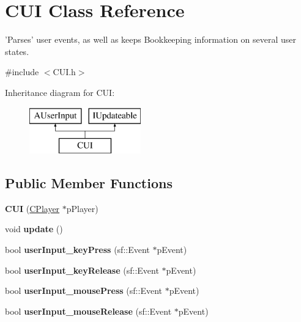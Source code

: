 \hypertarget{classCUI}{\section{C\-U\-I Class Reference}
\label{classCUI}
}


'Parses' user events, as well as keeps Bookkeeping information on several user states.  




{\ttfamily \#include $<$C\-U\-I.\-h$>$}

Inheritance diagram for C\-U\-I\-:\begin{figure}[H]
\begin{center}
\leavevmode
\includegraphics[height=2.000000cm]{classCUI}
\end{center}
\end{figure}
\subsection*{Public Member Functions}
\begin{DoxyCompactItemize}
\item 
\hypertarget{classCUI_aaca9bcb98d25fa4b4868bc3266f44ec6}{{\bfseries C\-U\-I} (\hyperlink{classCPlayer}{C\-Player} $\ast$p\-Player)}\label{classCUI_aaca9bcb98d25fa4b4868bc3266f44ec6}

\item 
\hypertarget{classCUI_ab0b322040b41a6650bd625216f77b75c}{void {\bfseries update} ()}\label{classCUI_ab0b322040b41a6650bd625216f77b75c}

\item 
\hypertarget{classCUI_addb1531f20541cb7c7f8688f1cd843e9}{bool {\bfseries user\-Input\-\_\-key\-Press} (sf\-::\-Event $\ast$p\-Event)}\label{classCUI_addb1531f20541cb7c7f8688f1cd843e9}

\item 
\hypertarget{classCUI_a0495bb6ad5fba9ef0552a487151f7896}{bool {\bfseries user\-Input\-\_\-key\-Release} (sf\-::\-Event $\ast$p\-Event)}\label{classCUI_a0495bb6ad5fba9ef0552a487151f7896}

\item 
\hypertarget{classCUI_a6edfa48bb429f6e1468f5c3568cf83c5}{bool {\bfseries user\-Input\-\_\-mouse\-Press} (sf\-::\-Event $\ast$p\-Event)}\label{classCUI_a6edfa48bb429f6e1468f5c3568cf83c5}

\item 
\hypertarget{classCUI_a64e3c8ad256e2d814e7112d201cb78ae}{bool {\bfseries user\-Input\-\_\-mouse\-Release} (sf\-::\-Event $\ast$p\-Event)}\label{classCUI_a64e3c8ad256e2d814e7112d201cb78ae}

\end{DoxyCompactItemize}
